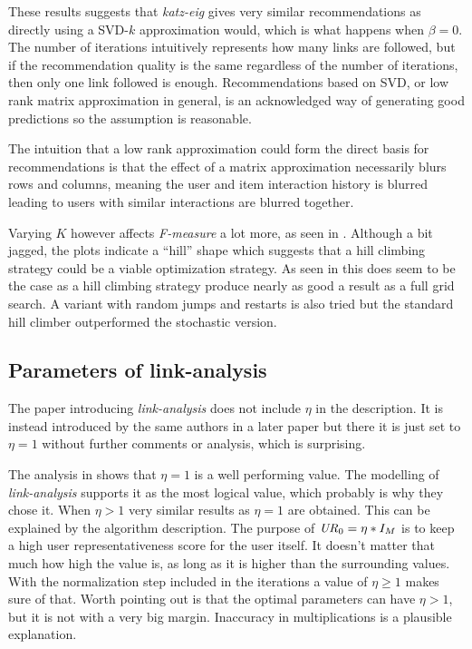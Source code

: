 These results suggests that \textit{katz-eig} gives very similar recommendations as directly using a SVD-$k$ approximation would, which is what happens when $\beta = 0$. The number of iterations intuitively represents how many links are followed, but if the recommendation quality is the same regardless of the number of iterations, then only one link followed is enough. Recommendations based on SVD, or low rank matrix approximation in general, is an acknowledged way of generating good predictions \citep{bobadilla2013recommender, lu2012recommender} so the assumption is reasonable.

The intuition that a low rank approximation could form the direct basis for recommendations is that the effect of a matrix approximation necessarily blurs rows and columns, meaning the user and item interaction history is blurred leading to users with similar interactions are blurred together.

Varying $K$ however affects \textit{F-measure} a lot more, as seen in . Although a bit jagged, the plots indicate a ``hill'' shape which suggests that a hill climbing strategy could be a viable optimization strategy. As seen in  this does seem to be the case as a hill climbing strategy produce nearly as good a result as a full grid search. A variant with random jumps and restarts is also tried but the standard hill climber outperformed the stochastic version.

\subsection{Parameters of link-analysis}

The paper introducing \textit{link-analysis} \cite{huang2004link} does not include $\eta$ in the description. It is instead introduced by the same authors in a later paper \cite{huang2007comparison} but there it is just set to $\eta = 1$ without further comments or analysis, which is surprising.

The analysis in  shows that $\eta = 1$ is a well performing value. The modelling of \textit{link-analysis} supports it as the most logical value, which probably is why they chose it. When $\eta > 1$ very similar results as $\eta = 1$ are obtained. This can be explained by the algorithm description. The purpose of $\mathit{UR}_0 = \eta * I_M$ is to keep a high user representativeness score for the user itself. It doesn't matter that much how high the value is, as long as it is higher than the surrounding values. With the normalization step included in the iterations a value of $\eta \geq 1$ makes sure of that. Worth pointing out is that the optimal parameters can have $\eta > 1$, but it is not with a very big margin. Inaccuracy in multiplications is a plausible explanation.

